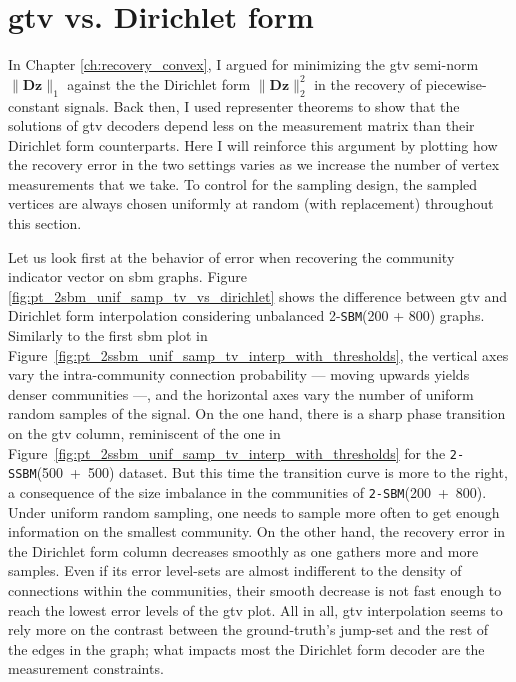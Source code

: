 \section{\texorpdfstring{\acrfull{gtv}}{Graph Total Variation} vs. Dirichlet form}

In Chapter \ref{ch:recovery_convex}, I argued for minimizing the \acrshort{gtv} semi-norm $\|\mathbf{Dz}\|_1$ against the the Dirichlet form $\| \mathbf{Dz} \|_2^2$ in the recovery of piecewise-constant signals. Back then, I used representer theorems to show that the solutions of \acrshort{gtv} decoders depend less on the measurement matrix than their Dirichlet form counterparts. Here I will reinforce this argument by plotting how the recovery error in the two settings varies as we increase the number of vertex measurements that we take. To control for the sampling design, the sampled vertices are always chosen uniformly at random (with replacement) throughout this section.

Let us look first at the behavior of error when recovering the community indicator vector on \acrshort{sbm} graphs. Figure \ref{fig:pt_2sbm_unif_samp_tv_vs_dirichlet} shows the difference between \acrshort{gtv} and Dirichlet form interpolation considering unbalanced 2-\texttt{SBM}(200 + 800) graphs. Similarly to the first \acrshort{sbm} plot in Figure~\ref{fig:pt_2ssbm_unif_samp_tv_interp_with_thresholds}, the vertical axes vary the intra-community connection probability --- moving upwards yields denser communities ---, and the horizontal axes vary the number of uniform random samples of the signal. On the one hand, there is a sharp phase transition on the \acrshort{gtv} column, reminiscent of the one in Figure~\ref{fig:pt_2ssbm_unif_samp_tv_interp_with_thresholds} for the \texttt{2-SSBM}(500~+~500) dataset. But this time the transition curve is more to the right, a consequence of the size imbalance in the communities of \texttt{2-SBM}(200~+~800). Under uniform random sampling, one needs to sample more often to get enough information on the smallest community. On the other hand, the recovery error in the Dirichlet form column decreases smoothly as one gathers more and more samples. Even if its error level-sets are almost indifferent to the density of connections within the communities, their smooth decrease is not fast enough to reach the lowest error levels of the \acrshort{gtv} plot. All in all, \acrshort{gtv} interpolation seems to rely more on the contrast between the ground-truth's jump-set and the rest of the edges in the graph; what impacts most the Dirichlet form decoder are the measurement constraints.

